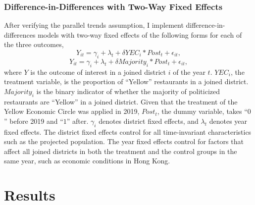 \documentclass[letterpaper, 12pt]{article}
\begin{document}
\subsubsection{Difference-in-Differences with Two-Way Fixed Effects}

After verifying the parallel trends assumption, I implement difference-in-differences models with two-way fixed effects of the following forms for each of the three outcomes,
\begin{equation}
   Y_{it} = \gamma_{i} + \lambda_{t} + \delta YEC_i * Post_t + \epsilon_{it}, 
\end{equation}
\begin{equation}
    Y_{it} = \gamma_{i} + \lambda_{t} + \delta Majority_i * Post_t + \epsilon_{it},
\end{equation}
where $Y$ is the outcome of interest in a joined district $i$ of the year $t$. $YEC_{i}$, the treatment variable, is the proportion of ``Yellow'' restaurants in a joined district. $Majority_i$ is the binary indicator of whether the majority of politicized restaurants are ``Yellow'' in a joined district. Given that the treatment of the Yellow Economic Circle was applied in 2019, $Post_t$, the dummy variable, takes ``$0$'' before 2019 and ``$1$'' after. $\gamma_{i}$ denotes district fixed effects, and $\lambda_{t}$ denotes year fixed effects. The district fixed effects control for all time-invariant characteristics such as the projected population. The year fixed effects control for factors that affect all joined districts in both the treatment and the control groups in the same year, such as economic conditions in Hong Kong.





\clearpage
\section{Results}
\end{document}
